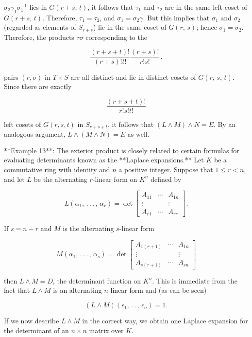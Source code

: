 \(\sigma_{2}\gamma_{1}\sigma_{1}^{-1}\) lies in \(G(r+s,\,t)\), it follows that \(\tau_{1}\) and \(\tau_{2}\) are in the same left coset of \(G(r+s,\,t)\). Therefore, \(\tau_{1}=\tau_{2}\), and \(\sigma_{1}=\sigma_{2}\gamma\). But this implies that \(\sigma_{1}\) and \(\sigma_{2}\) (regarded as elements of \(S_{r+s}\)) lie in the same coset of \(G(r,\,s)\); hence \(\sigma_{1}=\sigma_{2}\). Therefore, the products \(\tau\sigma\) corresponding to the

\[\frac{(r+s+t)!}{(r+s)!t!}\frac{(r+s)!}{r!s!}\,.\]

pairs \((r,\sigma)\) in \(T\times S\) are all distinct and lie in distinct cosets of \(G(r,\,s,\,t)\). Since there are exactly

\[\frac{(r+s+t)!}{r!s!t!}\]

left cosets of \(G(r,s,t)\) in \(S_{r+s+t}\), it follows that \((L\wedge M)\wedge N=E\). By an analogous argument, \(L\wedge(M\wedge N)=E\) as well.  

**Example 13**: The exterior product is closely related to certain formulas for evaluating determinants known as the **Laplace expansions.** Let \(K\) be a commutative ring with identity and \(n\) a positive integer. Suppose that \(1\leq r<n\), and let \(L\) be the alternating \(r\)-linear form on \(K^{n}\) defined by

\[L(\alpha_{1},\,.\,.\,.\,,\,\alpha_{r})=\det\begin{bmatrix}A_{11}&\cdots&A_{1n }\\ \vdots&&\vdots\\ A_{r1}&\cdots&A_{rr}\end{bmatrix}.\]

If \(s=n-r\) and \(M\) is the alternating \(s\)-linear form

\[M(\alpha_{1},\,.\,.\,.\,,\,\alpha_{s})=\det\begin{bmatrix}A_{1(r+1)}&\cdots&A _{1n}\\ \vdots&&\vdots\\ A_{s(r+1)}&\cdots&A_{sn}\end{bmatrix}\]

then \(L\wedge M=D\), the determinant function on \(K^{n}\). This is immediate from the fact that \(L\wedge M\) is an alternating \(n\)-linear form and (as can be seen)

\[(L\wedge M)(\epsilon_{1},\,.\,.\,,\,\epsilon_{n})=1.\]

If we now describe \(L\wedge M\) in the correct way, we obtain one Laplace expansion for the determinant of an \(n\times n\) matrix over \(K\).

